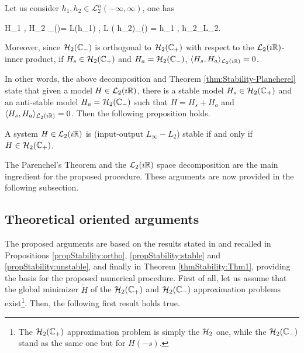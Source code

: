 \documentclass[graybox]{svmult}
\begin{document}
\begin{theorem}[Plancherel] \label{thm:Stability-Plancherel}
	Let us consider $ h_1,  h_2 \in \mathcal L^n_2(-\infty,\infty)$, one has
	\begin{eq}
		\langle H_1 , H_2 \rangle_{\Ltwo(\imath\Real)}=  \langle  \mathcal L(h_1) , \mathcal L ( h_2)\rangle_{\Ltwo(\imath\Real)} = \langle  h_1 ,  h_2\rangle_{L_2}.
	\end{eq}
	Moreover, since ${\mathcal{H}_{2}}(\mathbb{C}_-)$ is orthogonal to ${\mathcal{H}_{2}}(\mathbb{C}_+)$ with respect to the ${\mathcal{L}_{2}}(\imath\mathbb{R})$-inner product, if $H_s \in {\mathcal{H}_{2}}(\mathbb{C}_+)$ and $H_a = {\mathcal{H}_{2}}(\mathbb{C}_-)$, $\langle H_s, H_a \rangle_{{\mathcal{L}_{2}}(\imath\mathbb{R})} =0$.
\end{theorem}
In other words, the above decomposition and Theorem \ref{thm:Stability-Plancherel} state that given a model $H\in{\mathcal{L}_{2}}(\imath\mathbb{R})$, there is a stable model  $H_s \in {\mathcal{H}_{2}}(\mathbb{C}_+)$ and an anti-stable model  $H_a = {\mathcal{H}_{2}}(\mathbb{C}_-)$ such that $H = {H}_s +H_a$ and $\langle H_s, H_a \rangle_{{\mathcal{L}_{2}}(\imath\mathbb{R})} =0$. Then the following proposition holds.

\begin{proposition}
	A system $H \in {\mathcal{L}_{2}}(\imath\mathbb{R})$  is (input-output $L_\infty - L_2$) stable if and only if 
	$H\in {\mathcal{H}_{2}}(\mathbb{C}_+)$. 
\end{proposition}
The Parenchel's Theorem and the ${\mathcal{L}_{2}}(\imath\mathbb{R})$ space decomposition are the main ingredient for the proposed \mfsa procedure. These arguments are now provided in the following subsection.

\subsection{Theoretical \mfsa oriented arguments}

The proposed arguments are based on the results stated in \cite{PontesECC:2015} and recalled in Propositions \ref{propStability:ortho}, \ref{propStability:stable} and \ref{propStability:unstable}, and finally in Theorem \ref{thmStability:Thm1}, providing the basis for the proposed numerical procedure. First of all, let us assume that the global minimizer $\tilde H$ of the ${\mathcal{H}_{2}}(\mathbb{C}_+)$ and ${\mathcal{H}_{2}}(\mathbb{C}_-)$ approximation problems exist\footnote{The ${\mathcal{H}_{2}}(\mathbb{C}_+)$ approximation problem is simply the ${\mathcal{H}_{2}}$ one, while the ${\mathcal{H}_{2}}(\mathbb{C}_-)$ stand as the same one but for $H(-s)$.}. Then, the following first result holds true.
\end{document}
